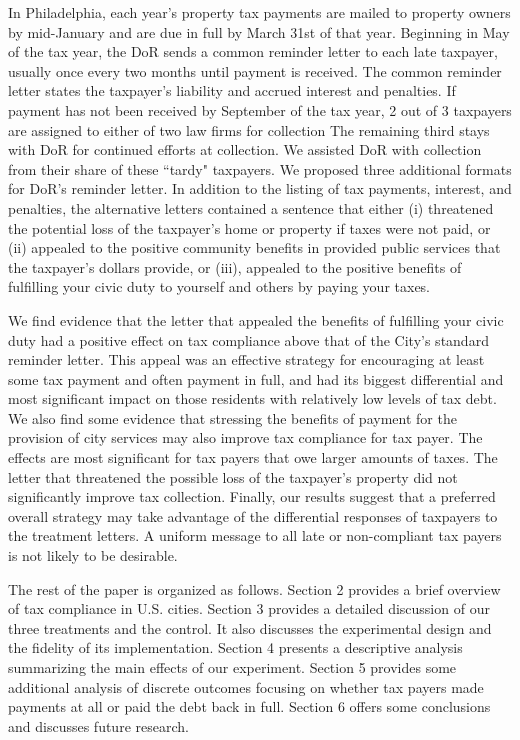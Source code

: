 \documentclass[12pt,titlepage]{article}
\begin{document}
In Philadelphia, each year's property tax payments are mailed to
property owners by mid-January and are due in full by March 31st of
that year.  Beginning in May of the tax year, the DoR sends a common
reminder letter to each late taxpayer, usually once every two months
until payment is received.  The common reminder letter states the
taxpayer's liability and accrued interest and penalties.  If payment
has not been received by September of the tax year, 2 out of 3 taxpayers
are assigned  to either of two law firms for collection The remaining third 
stays with DoR for continued efforts at collection.  We
assisted DoR with collection from their share of these ``tardy"
taxpayers.  We proposed three additional formats for DoR's reminder
letter.  In addition to the listing of tax payments, interest, and
penalties, the alternative letters contained a sentence that either
(i) threatened the potential loss of the taxpayer's home or property
if taxes were not paid, or (ii) appealed to the positive community
benefits in provided public services that the taxpayer's dollars
provide, or (iii), appealed to the positive benefits of fulfilling
your civic duty to yourself and others by paying your taxes.

We find evidence that the letter that appealed the benefits of
fulfilling your civic duty had a positive 
effect on tax compliance above that of the City's standard reminder
letter.  This appeal was an effective strategy for encouraging
at least some tax payment and often payment in full, and had its
biggest differential and most significant impact on those residents
with relatively low levels of tax debt.  We also find some evidence
that stressing the benefits of payment for the provision of city
services may also improve tax compliance for tax payer. The effects
are most significant for tax payers that owe larger
amounts of taxes. The letter that threatened the possible loss of the
taxpayer's property did not significantly improve tax
collection. Finally, our results suggest that a preferred overall
strategy may take advantage of the differential responses of taxpayers
to the treatment letters. A uniform message to all late or
non-compliant tax payers is not likely to be desirable.

The rest of the paper is organized as follows.  Section 2 provides a
brief overview of tax compliance in U.S. cities. Section 3 provides
a detailed discussion of our three treatments and the control. It also
discusses the experimental design and the fidelity of its
implementation. Section 4 presents a descriptive analysis summarizing
the main effects of our experiment.  Section 5 provides some additional
analysis of discrete outcomes focusing on whether tax payers made 
payments at all or paid the debt back in full.
Section 6 offers some conclusions and discusses future research.
\end{document}
